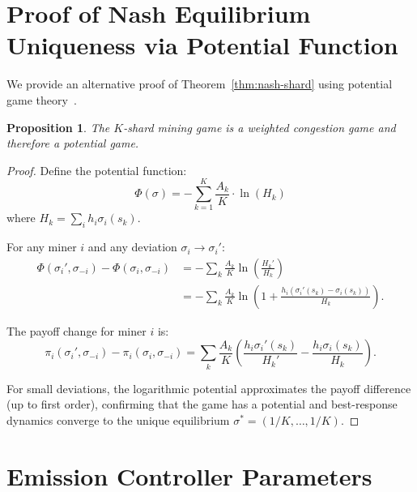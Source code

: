 \documentclass[11pt,a4paper]{article}
\newtheorem{proposition}[theorem]{Proposition}
\theoremstyle{definition}
\theoremstyle{remark}
\newcommand{\payoff}{\pi}
\newcommand{\strategy}{\sigma}
\newcommand{\hashrate}{h}
\newcommand{\Hashrate}{H}
\begin{document}
\appendix

\section{Proof of Nash Equilibrium Uniqueness via Potential Function}\label{app:potential}

We provide an alternative proof of Theorem~\ref{thm:nash-shard} using
potential game theory~\cite{monderer1996potential,rosenthal1973class}.

\begin{proposition}\label{prop:potential}
The $K$-shard mining game is a weighted congestion game and therefore
a potential game.
\end{proposition}

\begin{proof}
Define the potential function:
\[
  \Phi(\strategy) = -\sum_{k=1}^{K} \frac{A_k}{K} \cdot \ln(\Hashrate_k)
\]
where $\Hashrate_k = \sum_i \hashrate_i \strategy_i(s_k)$.

For any miner $i$ and any deviation $\strategy_i \to \strategy_i'$:
\begin{align*}
  \Phi(\strategy_i', \strategy_{-i}) - \Phi(\strategy_i, \strategy_{-i})
  &= -\sum_k \frac{A_k}{K} \ln\!\left(\frac{\Hashrate_k'}{\Hashrate_k}\right) \\
  &= -\sum_k \frac{A_k}{K} \ln\!\left(1 + \frac{\hashrate_i(\strategy_i'(s_k) -
     \strategy_i(s_k))}{\Hashrate_k}\right).
\end{align*}

The payoff change for miner $i$ is:
\[
  \payoff_i(\strategy_i', \strategy_{-i}) - \payoff_i(\strategy_i, \strategy_{-i})
  = \sum_k \frac{A_k}{K} \left(\frac{\hashrate_i \strategy_i'(s_k)}{\Hashrate_k'} -
    \frac{\hashrate_i \strategy_i(s_k)}{\Hashrate_k}\right).
\]

For small deviations, the logarithmic potential approximates the payoff
difference (up to first order), confirming that the game has a potential
and best-response dynamics converge to the unique equilibrium
$\strategy^* = (1/K, \ldots, 1/K)$.
\end{proof}

\section{Emission Controller Parameters}\label{app:parameters}
\end{document}
